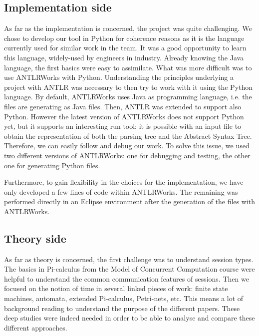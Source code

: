 \documentclass[a4paper,11pt,twoside]{report}
\begin{document}
\subsection*{Implementation side}
As far as the implementation is concerned, the project was quite challenging. We chose to develop our tool in Python for coherence reasons as it is the language currently used for similar work in the team. It was a good opportunity to learn this language, widely-used by engineers in industry. Already knowing the Java language, the first basics were easy to assimilate. What was more difficult was to use ANTLRWorks with Python. Understanding the principles underlying a project with ANTLR was necessary to then try to work with it using the Python language. By default, ANTLRWorks uses Java as programming language, i.e. the files are generating as Java files. Then, ANTLR was extended to support also Python. However the latest version of ANTLRWorks does not support Python yet, but it supports an interesting run tool: it is possible with an input file to obtain the representation of both the parsing tree and the Abstract Syntax Tree. Therefore, we can easily follow and debug our work. To solve this issue, we used two different versions of ANTLRWorks: one for debugging and testing, the other one for generating Python files.

Furthermore, to gain flexibility in the choices for the implementation, we have only developed a few lines of code within ANTLRWorks. The remaining was performed directly in an Eclipse environment after the generation of the files with ANTLRWorks.
 
\subsection*{Theory side}
As far as theory is concerned, the first challenge was to understand session types. The basics in Pi-calculus from the Model of Concurrent Computation course were helpful to understand the common communication features of sessions. Then we focused on the notion of time in several linked pieces of work: finite state machines, automata, extended Pi-calculus, Petri-nets, etc. This means a lot of background reading to understand the purpose of the different papers. These deep studies were indeed needed in order to be able to analyse and compare these different approaches.
\end{document}
